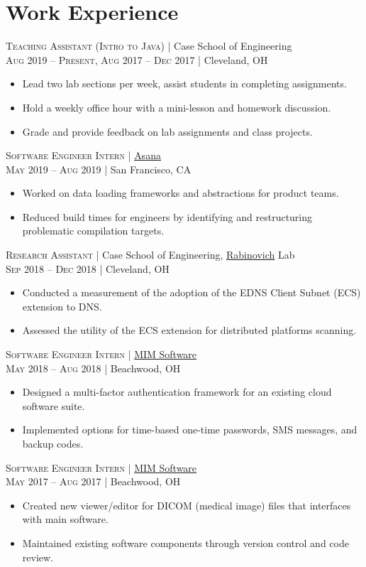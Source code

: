 \documentclass[a4paper,11pt]{article}
\begin{document}
\section{Work Experience}
\textsc{Teaching Assistant (Intro to Java)} | Case School of Engineering \\
\textsc{Aug 2019 – Present, Aug 2017 – Dec 2017} | Cleveland, OH
\begin{itemize}
	 \item	Lead two lab sections per week, assist students in completing assignments.
	 \item Hold a weekly office hour with a mini-lesson and homework discussion.
	 \item Grade and provide feedback on lab assignments and class projects.
\end{itemize}
\vskip 2mm
\textsc{Software Engineer Intern} | \href{https://asana.com}{Asana} \\
\textsc{May 2019 – Aug 2019} | San Francisco, CA
\begin{itemize}
	\item Worked on data loading frameworks and abstractions for product teams.
	\item Reduced build times for engineers by identifying and restructuring problematic compilation targets.
\end{itemize}
\vskip 2mm
\textsc{Research Assistant} | Case School of Engineering, \href{http://engr.case.edu/rabinovich_michael/}{Rabinovich} Lab \\
\textsc{Sep 2018 – Dec 2018} | Cleveland, OH
\begin{itemize}
	\item Conducted a measurement of the adoption of the EDNS Client Subnet (ECS) extension to DNS.
	\item Assessed the utility of the ECS extension for distributed platforms scanning.
\end{itemize}
\vskip 2mm
\textsc{Software Engineer Intern} | \href{https://www.mimsoftware.com}{MIM Software} \\
\textsc{May 2018 – Aug 2018} | Beachwood, OH
\begin{itemize}
	\item Designed a multi-factor authentication framework for an existing cloud software suite.
	\item Implemented options for time-based one-time passwords, SMS messages, and backup codes.
\end{itemize}
 \vskip 2mm
 \textsc{Software Engineer Intern} | \href{https://www.mimsoftware.com}{MIM Software} \\
 \textsc{May 2017 – Aug 2017} | Beachwood, OH
 \begin{itemize}
	\item Created new viewer/editor for DICOM (medical image) files that interfaces with main software.
	\item Maintained existing software components through version control and code review.
 \end{itemize}
\end{document}
